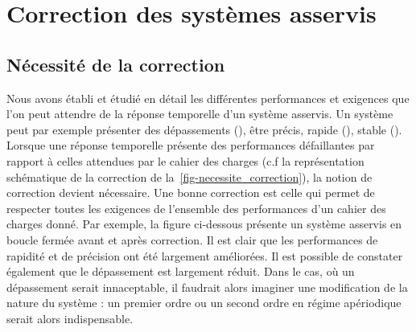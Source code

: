 \chapter{Correction des systèmes asservis\label{chap-correc}}
\minitoc
\newpage
\section{Nécessité de la correction}
Nous avons établi et étudié en détail les différentes performances et 
exigences que l'on peut attendre de la réponse temporelle d'un système asservis.
Un système peut par exemple présenter des dépassements 
(), être précis, rapide (), stable 
(). Lorsque une réponse temporelle présente des performances
défaillantes par rapport à celles attendues par le cahier des charges (c.f 
la représentation schématique de la correction de 
la~\cref{fig-necessite_correction}), la notion de correction devient 
nécessaire. Une bonne correction est celle qui permet de respecter toutes
les exigences de l'ensemble des performances d'un cahier des charges donné. 
Par exemple, la figure ci-dessous présente un système asservis 
en boucle fermée avant et après correction. Il est clair que les performances
de rapidité et de précision ont été largement améliorées. Il est possible de 
constater également que le dépassement est largement réduit. Dans le cas, 
où un dépassement serait innaceptable, il faudrait alors imaginer une 
modification de la nature du système : un premier ordre ou un second ordre
en régime apériodique serait alors indispensable.

